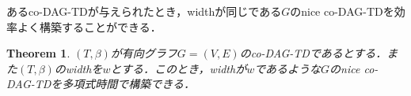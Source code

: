 \documentclass[master]{kuisthesis}		%
\theoremstyle{plain}
\newtheorem{theorem}{Theorem}
\theoremstyle{definition}
\begin{document}

あるco-DAG-TDが与えられたとき，widthが同じである$G$のnice co-DAG-TDを効率よく構築することができる．

\begin{theorem}
    $(T, \beta)$が有向グラフ$G=(V, E)$のco-DAG-TDであるとする．また$(T, \beta)$のwidthを$w$とする．このとき，widthが$w$であるような$G$のnice co-DAG-TDを多項式時間で構築できる．
\end{theorem}
\end{document}

